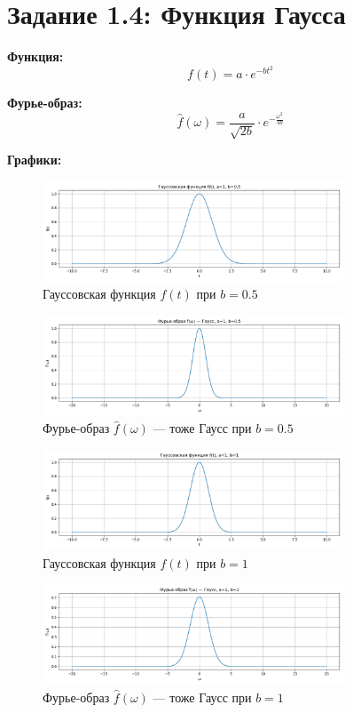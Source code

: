 \section*{Задание 1.4: Функция Гаусса}

\textbf{Функция:}
\[
f(t) = a \cdot e^{-b t^2}
\]

\textbf{Фурье-образ:}
\[
\hat{f}(\omega) = \frac{a}{\sqrt{2b}} \cdot e^{-\frac{\omega^2}{4b}}
\]

\textbf{Графики:}

\begin{figure}[H]
    \centering
    \includegraphics[width=0.8\textwidth]{python/gauss_function_b0.5.png}
    \caption{Гауссовская функция $f(t)$ при $b = 0.5$}
\end{figure}

\begin{figure}[H]
    \centering
    \includegraphics[width=0.8\textwidth]{python/gauss_fourier_b0.5.png}
    \caption{Фурье-образ $\hat{f}(\omega)$ — тоже Гаусс при $b = 0.5$}
\end{figure}

\begin{figure}[H]
    \centering
    \includegraphics[width=0.8\textwidth]{python/gauss_function_b1.png}
    \caption{Гауссовская функция $f(t)$ при $b = 1$}
\end{figure}

\begin{figure}[H]
    \centering
    \includegraphics[width=0.8\textwidth]{python/gauss_fourier_b1.png}
    \caption{Фурье-образ $\hat{f}(\omega)$ — тоже Гаусс при $b = 1$}
\end{figure}

